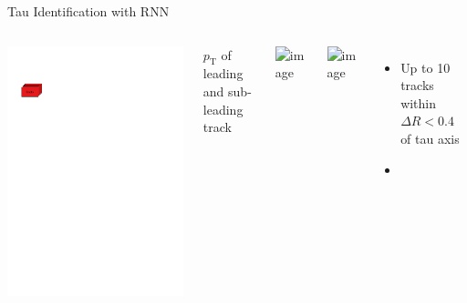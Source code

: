\documentclass[11pt, xcolor={dvipsnames}, aspectratio=169]{beamer}
\begin{document}
\begin{frame}{Tau Identification with RNN}
  \begin{columns}[onlytextwidth]
     \centering

    \includegraphics[scale=1]{tauid/track_icon}


    {\centering
      $p_{\text{T}}$ of leading and sub-leading track\\[0.17em]
    }

    \begin{columns}[onlytextwidth]
       \centering

      \includegraphics<1>[width=0.9\textwidth]{tauid/invars/invars_trk0relpt_1P}

      \centering

      \includegraphics<1>[width=0.9\textwidth]{tauid/invars/invars_trk1relpt_1P}
    \end{columns}

    \vspace*{0.5em}

    \begin{itemize}
    \item Up to 10 tracks within $\Delta R < 0.4$ of tau axis
    \item
    \end{itemize}
  \end{columns}
\end{frame}
\end{document}
